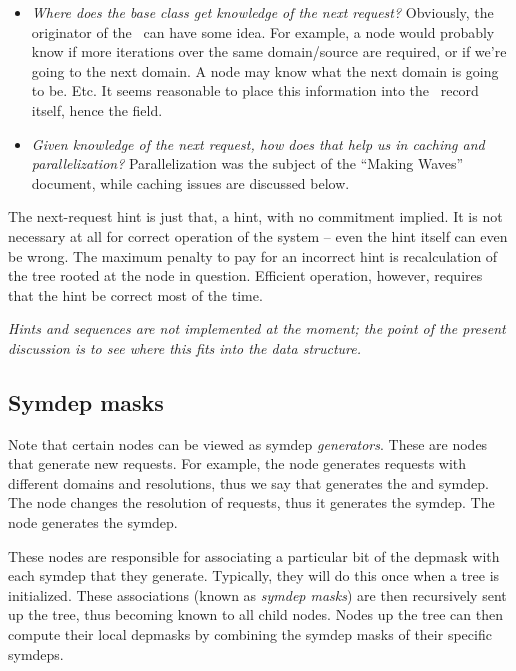   \begin{itemize}
  
  \item {\em Where does the base  class get knowledge of the next
    request?} Obviously, the originator of the \Request\ can have some idea. 
    For example, a  node would probably know if more iterations over
    the same domain/source are required, or if we're going to the next domain.
    A  node may know what the next domain is going to be. Etc. It
    seems reasonable to place this information into the \Request\ record
    itself, hence the  field.

  \item {\em Given knowledge of the next request, how does that help us in
    caching and parallelization?} Parallelization was the subject of the
    ``Making Waves'' document, while caching issues are discussed below.

  \end{itemize}
  
  The next-request hint is just that, a hint, with no commitment implied. It is
  not necessary at all for correct operation of the system -- even the hint
  itself can even be wrong. The maximum penalty to pay for an incorrect hint is
  recalculation of the tree rooted at the node in question. Efficient
  operation, however, requires that the hint be correct most of the time.

  {\em Hints and sequences are not implemented at the moment; the point of
  the present discussion is to see where this fits into the data structure.}

\subsection{Symdep masks}

  Note that certain nodes can be viewed as symdep {\em generators}. These are
  nodes that generate new requests. For example, the  node generates
  requests with different domains and resolutions, thus we say that 
  generates the  and  symdep. The  node
  changes the resolution of requests, thus it generates the 
  symdep. The  node generates the  symdep.
  
  These nodes are responsible for associating a particular bit of the depmask
  with each symdep that they generate. Typically, they will do this once when a
  tree is initialized. These associations (known as {\em symdep masks}) are
  then recursively sent up the tree, thus becoming known to all child nodes.
  Nodes up the tree can then compute their local depmasks by combining the
  symdep masks of their specific symdeps.

